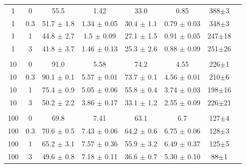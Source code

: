 \documentclass[11pt]{article}
\begin{document}
\begin{table}[htbp]
{\begin{tabular}{cccccccc}
        \\ 
        \hline
        

        1   & 0 & 55.5 & 1.42 & 33.0 & 0.85 & 388$\pm$3\\
        1   & 0.3&51.7 $\pm$ 1.8 & 1.34 $\pm$ 0.05 & 30.4 $\pm$ 1.1 & 0.79 $\pm$ 0.03 & 348$\pm$3\\ 
        1   & 1 & 44.8 $\pm$ 2.7 & 1.5 $\pm$ 0.09 & 27.1 $\pm$ 1.5 & 0.91 $\pm$ 0.05 & 247$\pm$18\\ 
        1   & 3 & 41.8 $\pm$ 3.7 & 1.46 $\pm$ 0.13 & 25.3 $\pm$ 2.6 & 0.88 $\pm$ 0.09 & 251$\pm$26\\\\ 

        10  & 0 & 91.0 & 5.58 & 74.2 & 4.55 & 226$\pm$1\\ 
        10  & 0.3&90.1 $\pm$ 0.1 & 5.57 $\pm$ 0.01 & 73.7 $\pm$ 0.1 & 4.56 $\pm$ 0.01 & 210$\pm$6\\ 
        10  & 1 & 75.4 $\pm$ 0.9 & 5.05 $\pm$ 0.06 & 55.8 $\pm$ 0.4 & 3.74 $\pm$ 0.03 & 198$\pm$16\\ 
        10  & 3 & 50.2 $\pm$ 2.2 & 3.86 $\pm$ 0.17 & 33.1 $\pm$ 1.2 & 2.55 $\pm$ 0.09 & 226$\pm$21\\\\ 
        
        100 & 0 &69.8 & 7.41 & 63.1 & 6.7 & 127$\pm$4\\ 
        100 & 0.3&70.6 $\pm$ 0.5 & 7.43 $\pm$ 0.06 & 64.2 $\pm$ 0.6 & 6.75 $\pm$ 0.06 & 128$\pm$3\\ 
        100 & 1 & 65.2 $\pm$ 3.1 & 7.57 $\pm$ 0.36 & 55.9 $\pm$ 3.2 & 6.49 $\pm$ 0.37 & 125$\pm$5\\ 
        100 & 3 & 49.6 $\pm$ 0.8 & 7.18 $\pm$ 0.11 & 36.6 $\pm$ 0.7 & 5.30 $\pm$ 0.10 & 88$\pm$1 
    \end{tabular}
}
\end{table}
\end{document}
